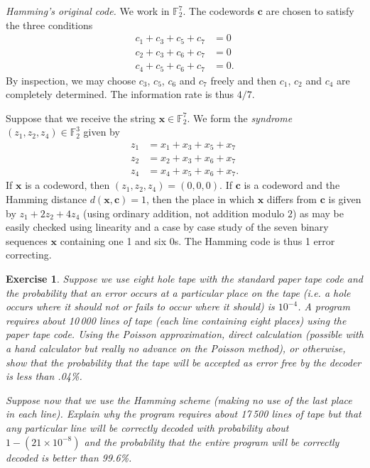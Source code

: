 \documentclass[12pt,a4paper]{article}
\theoremstyle{plain}
\newtheorem{exercise}[theorem]{Exercise}
\theoremstyle{definition}
\begin{document}
\noindent\emph{Hamming's original code.}
We work in ${\mathbb F}_{2}^{7}$. The codewords
${\mathbf c}$ are chosen to satisfy the
three conditions
\begin{align*}
c_{1}+c_{3}+c_{5}+c_{7}&=0\\
c_{2}+c_{3}+c_{6}+c_{7}&=0\\
c_{4}+c_{5}+c_{6}+c_{7}&=0.
\end{align*}
By inspection, we may choose $c_{3}$, $c_{5}$, $c_{6}$
and $c_{7}$ freely and then $c_{1}$, $c_{2}$ and $c_{4}$
are completely determined. The information rate is
thus $4/7$.

Suppose that we receive the string
${\mathbf x}\in{\mathbb F}_{2}^{7}$.
We form the \emph{syndrome}
$(z_{1},z_{2},z_{4})\in{\mathbb F}_{2}^{3}$
given by
\begin{align*}
z_{1}&=x_{1}+x_{3}+x_{5}+x_{7}\\
z_{2}&=x_{2}+x_{3}+x_{6}+x_{7}\\
z_{4}&=x_{4}+x_{5}+x_{6}+x_{7}.
\end{align*}
If ${\mathbf x}$ is a codeword, then
$(z_{1},z_{2},z_{4})=(0,0,0)$.
If ${\mathbf c}$ is a codeword and
the Hamming distance $d({\mathbf x},{\mathbf c})=1$,
then the place in which ${\mathbf x}$ differs
from ${\mathbf c}$ is given by $z_{1}+2z_{2}+4z_{4}$
(using ordinary addition, not addition modulo $2$)
as may be easily checked using linearity
and a case by case study of the seven binary
sequences ${\mathbf x}$ containing one 1
and six 0s. The Hamming code is thus 1
error correcting.

\begin{exercise}\label{bacon}
Suppose we use eight hole tape with
the standard paper tape code
and the probability that an error occurs at a particular
place on the tape (i.e. a hole occurs where it should
not or fails to occur where it should) is $10^{-4}$.
A program requires about 10\,000 lines of tape
(each line containing eight places)
using the paper tape code. Using
the Poisson approximation, direct calculation
(possible with a hand calculator but really no
advance on the Poisson method), or otherwise,
show that the probability that the tape
will be accepted as error free by the decoder
is less than .04\%.

Suppose now that we use the Hamming scheme
(making no use of the last place in each line).
Explain why the program requires about
17\,500 lines of tape but that any
particular line will be correctly decoded
with probability about $1-(21\times 10^{-8})$
and the probability that the entire program
will be correctly decoded is better than
99.6\%.
\end{exercise}
\end{document}
